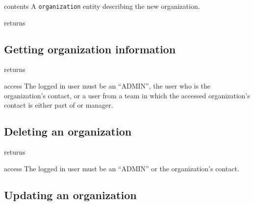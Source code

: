 \begin{apidata}{contents}
  A \texttt{organization} entity describing the new organization.
\end{apidata}
\begin{apidata}{returns}
  \begin{datalist}
  \end{datalist}
\end{apidata}


\subsection{Getting organization information}

\begin{apidata}{returns}
  \begin{datalist}
  \end{datalist}
\end{apidata}
\begin{apidata}{access}
The logged in user must be an ``ADMIN'', the user who is the organization's
contact, or a user from a team in which the accessed organization's contact is
either part of or manager.
\end{apidata}


\subsection{Deleting an organization}

\begin{apidata}{returns}
  \begin{datalist}
  \end{datalist}
\end{apidata}
\begin{apidata}{access}
The logged in user must be an ``ADMIN'' or the organization's contact.
\end{apidata}


\subsection{Updating an organization}

